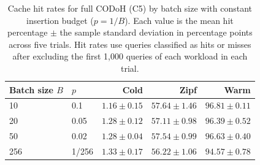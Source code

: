 \begin{table}[H]
\centering
\begin{tabular}{llrrr}
\toprule
Batch size $B$ & $p$ & Cold & Zipf & Warm \\
\midrule
10 & 0.1 & $1.16 \pm 0.15$ & $57.64 \pm 1.46$ & $96.81 \pm 0.11$ \\
20 & 0.05 & $1.28 \pm 0.12$ & $57.11 \pm 0.98$ & $96.39 \pm 0.52$ \\
50 & 0.02 & $1.28 \pm 0.04$ & $57.54 \pm 0.99$ & $96.63 \pm 0.40$ \\
256 & 1/256 & $1.33 \pm 0.17$ & $56.22 \pm 1.06$ & $94.57 \pm 0.78$ \\
\bottomrule
\end{tabular}
\caption{Cache hit rates for full CODoH (C5) by batch size with constant insertion budget ($p = 1/B$).
Each value is the mean hit percentage $\pm$ the sample standard
deviation in percentage points across five trials. Hit rates use
queries classified as hits or misses after excluding the first
1,000 queries of each workload in each trial.}
\label{tab:batch-size-plus-probability-cache-hits}
\end{table}
